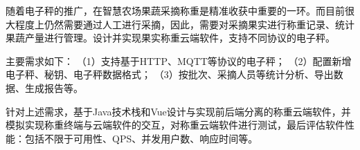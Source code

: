随着电子秤的推广，在智慧农场果蔬采摘称重是精准收获中重要的一环。而目前很大程度上仍然需要通过人工进行采摘，因此，需要对采摘果实进行称重记录、统计果蔬产量进行管理。设计并实现果实称重云端软件，支持不同协议的电子秤。

主要需求如下：
（1）支持基于HTTP、MQTT等协议的电子秤；
（2）配置新增电子秤、秘钥、电子秤数据格式；
（3）按批次、采摘人员等统计分析、导出数据、生成报告等。

针对上述需求，基于Java技术栈和Vue设计与实现前后端分离的称重云端软件，并模拟实现称重终端与云端软件的交互，对称重云端软件进行测试，最后评估软件性能：包括不限于可用性、QPS、并发用户数、响应时间等。
